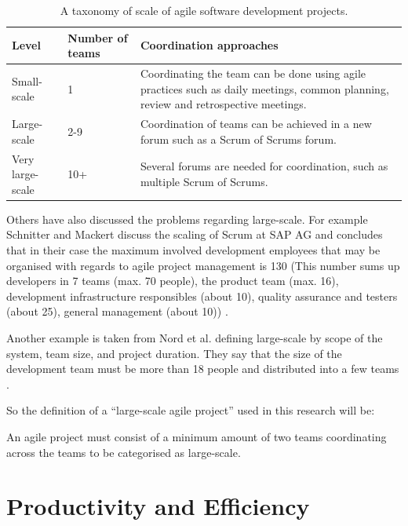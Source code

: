 \begin{table}[H]
\begin{center}
    \begin{tabular}{| l | l | p{7cm} |}
    \hline
    Level & Number of teams & Coordination approaches \\ \hline
    Small-scale & 1 & Coordinating the team can be done using agile practices such as daily meetings, common planning, review and retrospective meetings. \\ \hline
    Large-scale & 2-9 & Coordination of teams can be achieved in a new forum such as a Scrum of Scrums forum. \\ \hline
    Very large-scale & 10+ & Several forums are needed for coordination, such as multiple Scrum of Scrums. \\
    \hline
    \end{tabular}
    \caption{A taxonomy of scale of agile software development projects.}
    \label{Scale}
\end{center}
\end{table}

Others have also discussed the problems regarding large-scale. For example Schnitter and Mackert discuss the scaling of Scrum at SAP AG and concludes that in their case the maximum involved development employees that may be organised with regards to agile project management is 130 (This number sums up developers in 7 teams (max. 70 people), the product team (max. 16), development infrastructure responsibles (about 10), quality assurance and testers (about 25), general management (about 10)) \cite{Nord2011}.

Another example is taken from Nord et al. defining large-scale by scope of the system, team size, and project duration. They say that the size of the development team must be more than 18 people and distributed into a few teams \cite{Robert2014}.

So the definition of a ``large-scale agile project'' used in this research will be:

\begin{fancyquotes}
An agile project must consist of a minimum amount of two teams coordinating across the teams to be categorised as large-scale.
\end{fancyquotes}

\section{Productivity and Efficiency}